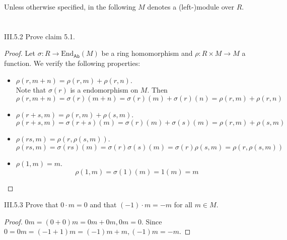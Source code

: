 Unless otherwise specified, in the following $M$ denotes a (left-)module over $R$.

\section{}

\begin{problem}{III.5.2}
Prove claim 5.1.
\end{problem}
\begin{proof}
Let $\sigma : R \to \text{End}_\mathsf{Ab}(M)$ be a ring homomorphism and $\rho : R \times M \to M$ a function. We verify the following properties:
\begin{itemize}
\setlength\itemsep{0pt}
\item $\rho(r,m+n) = \rho(r,m) + \rho(r,n)$. \\
Note that $\sigma(r)$ is a endomorphism on $M$. Then
\[
\rho(r,m+n) = \sigma(r)(m+n) = \sigma(r)(m) + \sigma(r)(n) = \rho(r,m) + \rho(r,n)
\]
\item $\rho(r+s, m) = \rho(r,m) + \rho(s,m)$.
\[
\rho(r+s, m) = \sigma(r+s)(m) = \sigma(r)(m) + \sigma(s)(m) = \rho(r,m) + \rho(s,m)
\]
\item $\rho(rs,m) = \rho(r,\rho(s,m))$.
\[
\rho(rs,m) = \sigma(rs)(m) = \sigma(r)\sigma(s)(m) = \sigma(r)\rho(s,m) = \rho(r,\rho(s,m))
\]
\item $\rho(1,m) = m$.
\[
\rho(1,m) = \sigma(1)(m) = 1(m) = m
\]
\end{itemize}
\end{proof}

\begin{problem}{III.5.3}
Prove that $0\cdot m = 0$ and that $(-1) \cdot m = -m$ for all $m \in M$.
\end{problem}
\begin{proof}
$0m = (0+0)m = 0m + 0m, 0m = 0$. Since $0 = 0m = (-1+1)m = (-1)m+m, (-1)m = -m$.
\end{proof}

